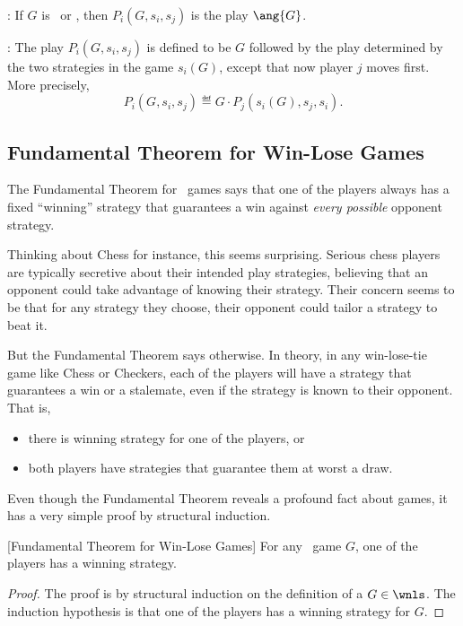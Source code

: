 \begin{definition}
\begin{staffnotes}
\begin{definition*}
: If $G$ is \winend\ or \loseend, then
$P_i(G,s_i,s_j)$ is the play $\ang{G}$.

: The play $P_i(G,s_i,s_j)$ is defined
to be $G$ followed by the play determined by the two strategies in the
game $s_i(G)$, except that now player $j$ moves first.  More
precisely,
\[
P_i(G,s_i,s_j) \eqdef G \cdot P_j(s_i(G),s_j,s_i).
\]
\end{definition*}
\end{staffnotes}

\subsection{Fundamental Theorem for Win-Lose Games}\label{FundThm_Games}

The Fundamental Theorem for \wnls\ games says that one of the players
always has a fixed ``winning'' strategy that guarantees a win against
\emph{every possible} opponent strategy.

Thinking about Chess for instance, this seems surprising.  Serious
chess players are typically secretive about their intended play
strategies, believing that an opponent could take advantage of knowing
their strategy.  Their concern seems to be that for any strategy they
choose, their opponent could tailor a strategy to beat it.

But the Fundamental Theorem says otherwise.  In theory, in any
win-lose-tie game like Chess or Checkers, each of the players will
have a strategy that guarantees a win or a stalemate, even if the
strategy is known to their opponent.  That is,
\begin{itemize}
\item there is winning strategy for one of the players, or
\item both players have strategies that guarantee them at worst a draw.
\end{itemize}

Even though the Fundamental Theorem reveals a profound fact about
games, it has a very simple proof by structural induction.

\begin{theorem}\label{fundgames}[Fundamental Theorem for Win-Lose Games]
For any \wnls\ game $G$, one of the players has a winning strategy.
\end{theorem}

\begin{proof}
The proof is by structural induction on the definition of a $G \in
\wnls$.  The induction hypothesis is that one of the players has a
winning strategy for $G$.


\end{proof}
\end{definition}
